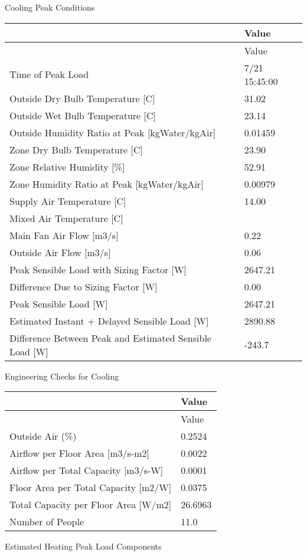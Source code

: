 Cooling Peak Conditions

{\scriptsize
\begin{longtable}[c]{@{}ll@{}}
\toprule 
 & Value \tabularnewline
\midrule
\endfirsthead

\toprule 
 & Value \tabularnewline
\midrule
\endhead

Time of Peak Load & 7/21 15:45:00 \tabularnewline
Outside Dry Bulb Temperature {[}C{]} & 31.02 \tabularnewline
Outside Wet Bulb Temperature {[}C{]} & 23.14 \tabularnewline
Outside Humidity Ratio at Peak {[}kgWater/kgAir{]} & 0.01459 \tabularnewline
Zone Dry Bulb Temperature {[}C{]} & 23.90 \tabularnewline
Zone Relative Humidity {[}\%{]} & 52.91 \tabularnewline
Zone Humidity Ratio at Peak {[}kgWater/kgAir{]} & 0.00979 \tabularnewline
Supply Air Temperature {[}C{]} & 14.00 \tabularnewline
Mixed Air Temperature {[}C{]} &  \tabularnewline
Main Fan Air Flow {[}m3/s{]} & 0.22 \tabularnewline
Outside Air Flow {[}m3/s{]} & 0.06 \tabularnewline
Peak Sensible Load with Sizing Factor {[}W{]} & 2647.21 \tabularnewline
Difference Due to Sizing Factor {[}W{]} & 0.00 \tabularnewline
Peak Sensible Load {[}W{]} & 2647.21 \tabularnewline
Estimated Instant + Delayed Sensible Load {[}W{]} & 2890.88 \tabularnewline
Difference Between Peak and Estimated Sensible Load {[}W{]} & -243.7 \tabularnewline
\bottomrule
\end{longtable}}

Engineering Checks for Cooling

{\scriptsize
\begin{longtable}[c]{@{}ll@{}}
\toprule 
 & Value \tabularnewline
\midrule
\endfirsthead

\toprule 
 & Value \tabularnewline
\midrule
\endhead


Outside Air (\%) & 0.2524 \tabularnewline
Airflow per Floor Area {[}m3/s-m2{]} & 0.0022 \tabularnewline
Airflow per Total Capacity {[}m3/s-W{]} & 0.0001 \tabularnewline
Floor Area per Total Capacity {[}m2/W{]} & 0.0375 \tabularnewline
Total Capacity per Floor Area {[}W/m2{]} & 26.6963 \tabularnewline
Number of People & 11.0 \tabularnewline

\bottomrule
\end{longtable}}


Estimated Heating Peak Load Components


